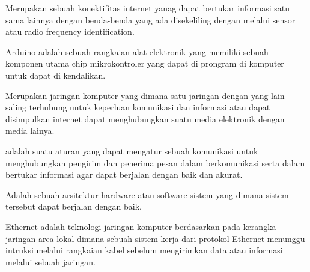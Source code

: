 Merupakan sebuah konektifitas internet yanag dapat bertukar informasi satu sama lainnya dengan benda-benda yang ada disekeliling dengan melalui sensor atau radio frequency identification.

Arduino adalah sebuah rangkaian alat elektronik yang memiliki sebuah komponen utama chip mikrokontroler yang dapat di prongram di komputer untuk dapat di kendalikan.

Merupakan jaringan komputer yang dimana satu jaringan dengan yang lain saling terhubung untuk keperluan komunikasi dan informasi atau dapat disimpulkan internet dapat menghubungkan suatu media elektronik dengan media lainya.

adalah suatu aturan yang dapat mengatur sebuah komunikasi untuk menghubungkan pengirim dan penerima pesan dalam berkomunikasi serta dalam bertukar informasi agar dapat berjalan dengan baik dan akurat.

Adalah sebuah arsitektur hardware atau software sistem yang dimana sistem tersebut dapat berjalan dengan baik.

 Ethernet adalah teknologi jaringan komputer berdasarkan pada kerangka jaringan area lokal  dimana sebuah sistem kerja dari protokol Ethernet menunggu intruksi melalui rangkaian kabel sebelum mengirimkan data atau informasi melalui sebuah jaringan.

